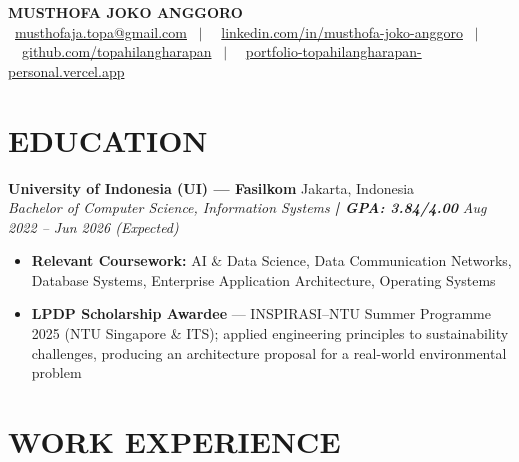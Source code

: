 \documentclass[10pt,a4paper]{article}
\newcommand{\contactline}[1]{\small #1}
\newcommand{\experienceheader}[4]{
    \textbf{#1} \hfill #2 \\
    \textit{#3} \hfill \textit{#4}
}
\begin{document}
\begin{center}
    {\LARGE \textbf{MUSTHOFA JOKO ANGGORO}} \\[2pt]
    \contactline{
        \faEnvelope\ \href{mailto:musthofaja.topa@gmail.com}{musthofaja.topa@gmail.com} \ $|$ \ 
        \faLinkedin\ \href{https://www.linkedin.com/in/musthofa-joko-anggoro/}{linkedin.com/in/musthofa-joko-anggoro} \ $|$ \
        \faGithub\ \href{https://github.com/topahilangharapan}{github.com/topahilangharapan} \ $|$ \
        \faGlobe\ \href{https://portfolio-topahilangharapan-personal.vercel.app/}{portfolio-topahilangharapan-personal.vercel.app}
    }
\end{center}

\vspace{-8pt}

\section*{EDUCATION}

\experienceheader{University of Indonesia (UI) --- Fasilkom}{Jakarta, Indonesia}{Bachelor of Computer Science, Information Systems \textbf{| GPA: 3.84/4.00}}{Aug 2022 -- Jun 2026 (Expected)}
\begin{itemize}[leftmargin=*, itemsep=0.5pt, topsep=1pt]
    \item \textbf{Relevant Coursework:} AI \& Data Science, Data Communication Networks, Database Systems, Enterprise Application Architecture, Operating Systems
    \item \textbf{LPDP Scholarship Awardee} --- INSPIRASI--NTU Summer Programme 2025 (NTU Singapore \& ITS); applied engineering principles to sustainability challenges, producing an architecture proposal for a real-world environmental problem
\end{itemize}

\vspace{-4pt}

\section*{WORK EXPERIENCE}
\end{document}
